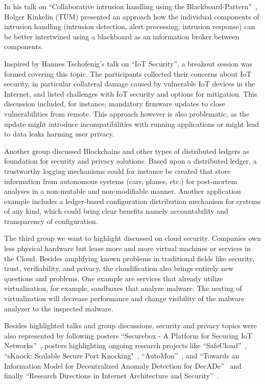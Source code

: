 In his talk on ``Collaborative intrusion handling using the
Blackboard-Pattern''~\cite{herold:iscs:2016}, Holger Kinkelin (TUM) presented an
approach how the individual components of intrusion handling (intrusion
detection, alert processing, intrusion response) can be better intertwined using
a blackboard as an information broker between components.


Inspired by Hannes Tschofenig's talk on ``IoT Security'', a breakout session was
formed covering this topic. The participants collected their concerns about IoT
security, in particular collateral damage caused by vulnerable IoT devices in
the Internet, and listed challenges with IoT security and options for
mitigation. This discussion included, for instance, mandatory firmware updates
to close vulnerabilities from remote. This approach however is also problematic,
as the update might introduce incompatibilities with running applications or
might lead to data leaks harming user privacy.

Another group discussed Blockchains and other types of distributed ledgers as
foundation for security and privacy solutions. Based upon a distributed ledger,
a trustworthy logging mechanisms could for instance be created that store
information from autonomous systems (cars, planes, etc.) for post-mortem
analyses in a non-mutable and non-modifiable manner. Another application example
includes a ledger-based configuration distribution mechanism for systems of any
kind, which could bring clear benefits namely accountability and transparency of
configuration.

The third group we want to highlight discussed on cloud security. Companies
own less physical hardware but lease  more and more virtual machines or services
in the Cloud. Besides amplifying known problems in traditional fields like
security, trust, verifiability, and privacy, the cloudification also brings
entirely new questions and problems. One example are services that already
utilize virtualization, for example, sandboxes that analyze malware. The nesting
of virtualization will decrease performance and change visibility of the malware
analyzer to the inspected malware.

Besides highlighted talks and group discussions, security and privacy topics
were also represented by following posters ``Securebox - A Platform for Securing
IoT Networks''~\cite{hafeez:s3:2015, hafeez:can:2016}, posters highlighting
ongoing research projects like ``SafeCloud''~\cite{safecloud},
``sKnock: Scalable Secure Port Knocking"~\cite{dsel:mcsp:2016},
``AutoMon''~\cite{automon}, and ``Towards an Information Model for Decentralized
Anomaly Detection for DecADe''~\cite{decade} and finally ``Research Directions
in Internet Architecture and Security''~\cite{glra, mms, ipv6hitlist}.
